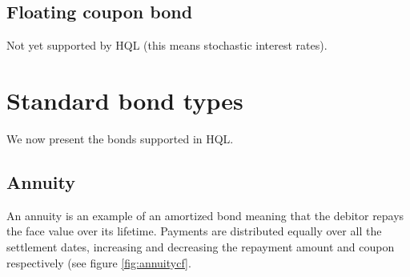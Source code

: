 \documentclass[11pt,a4paper]{article}
\numberwithin{equation}{section}
\begin{document}

\subsection{Floating coupon bond}
Not yet supported by HQL (this means stochastic interest rates).

\section{Standard bond types}

We now present the bonds supported in HQL.

\subsection{Annuity}

An annuity is an example of an amortized bond meaning that the debitor repays the
face value over its lifetime. Payments are distributed equally over all the settlement
dates, increasing and decreasing the repayment amount and coupon respectively (see figure
\ref{fig:annuitycf}.
\end{document}

